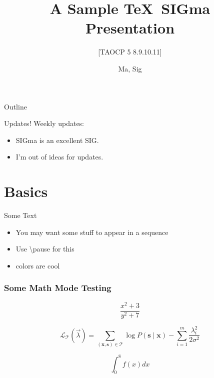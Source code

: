 \documentclass[aspectratio=169]{beamer}
\title{A Sample \TeX\ SIGma Presentation}
\subtitle{[TAOCP 5 8.9.10.11]}
\author{Ma, Sig}
\date{}
\begin{document}

\begin{frame}
\titlepage
\end{frame}

\begin{frame}{Outline}
  \tableofcontents
\end{frame}

\begin{frame}{Updates!}
  Weekly updates:
  \begin{itemize}
    \item SIGma is an excellent SIG.
    \item I'm out of ideas for updates.
  \end{itemize}
\end{frame}

\section{Basics}
\frame{\sectionpage}

\begin{frame}{Some Text}
    \begin{itemize}
        \item You may want some stuff to appear in a sequence \pause
        \item Use \textbackslash pause for this \pause
        \item \textcolor{sigma@mainblue}{colors} \textcolor{sigma@highlightpink}{are} \textcolor{sigma@alertred}{cool}
    \end{itemize}
\end{frame}

\begin{frame}
  \frametitle{Some Math Mode Testing}
  $$\frac{x^2+3}{y^2+7}$$

  \[
    \mathcal L_{\mathcal T}(\vec{\lambda})
    = \sum_{(\mathbf{x},\mathbf{s})\in \mathcal T}
       \log P(\mathbf{s}\mid\mathbf{x}) - \sum_{i=1}^m
       \frac{\lambda_i^2}{2\sigma^2}
  \]

  $$\int_0^8 f(x) dx$$
\end{frame}
\end{document}
